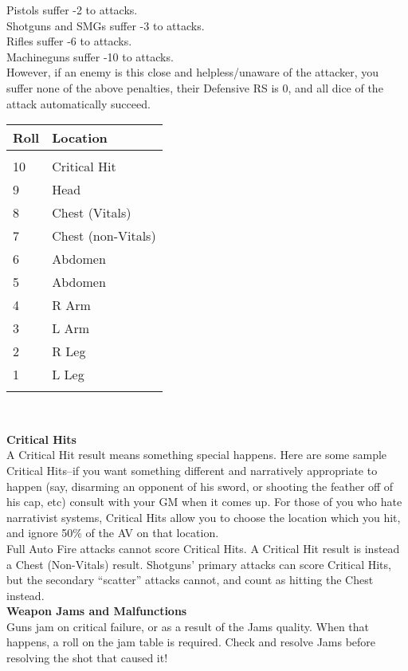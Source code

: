 \documentclass[a4paper, twocolumn, openany]{book}
\newlength{\indentlen}
\newcommand{\tabto}[1]{\setlength{\leftskip}{#1\indentlen}}
\begin{document}
{	\tabto{1}\noindent
	Pistols suffer -2 to attacks.\\
	Shotguns and SMGs suffer -3 to attacks.\\
	Rifles suffer -6 to attacks.\\
	Machineguns suffer -10 to attacks.\\

\tabto{0}
However, if an enemy is this close and helpless/unaware of the attacker, you suffer none of the
above penalties, their Defensive RS is 0, and all dice of the attack automatically succeed.\\

{
\centering
\begin{tabular}{ll}
Roll 	& Location \\ \hline \\
10 		& Critical Hit \\
9 		& Head \\
8 		& Chest (Vitals) \\
7 		& Chest (non-Vitals) \\
6		& Abdomen \\
5		& Abdomen \\
4		& R Arm \\
3		& L Arm \\
2		& R Leg \\
1		& L Leg \\
\\ \hline
\end{tabular}\\ } %

\newpage %
{\bfseries Critical Hits\\}
A Critical Hit result means something special happens. Here are some sample Critical Hits--if
you want something different and narratively appropriate to happen (say, disarming an
opponent of his sword, or shooting the feather off of his cap, etc) consult with your GM when it
comes up. For those of you who hate narrativist systems, Critical Hits allow you to choose the
location which you hit, and ignore 50\% of the AV on that location.\\
Full Auto Fire attacks cannot score Critical Hits. A Critical Hit result is instead a Chest
(Non-Vitals) result. Shotguns’ primary attacks can score Critical Hits, but the secondary “scatter”
attacks cannot, and count as hitting the Chest instead.\\

{\bfseries Weapon Jams and Malfunctions\\}
Guns jam on critical failure, or as a result of the Jams quality. When that happens, a roll on the
jam table is required. Check and resolve Jams before resolving the shot that caused it!\\

}
\end{document}
